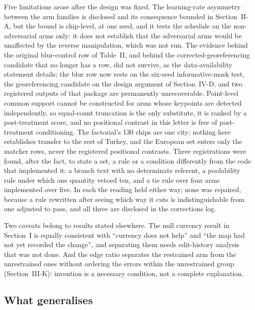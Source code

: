 Five limitations arose after the design was fixed. The learning-rate asymmetry between the
arm families is disclosed and its consequence bounded in Section~II-A, but the bound is
chip-level, at one seed, and it tests the schedule on the non-adversarial arms only: it
does not establish that the adversarial arms would be unaffected by the reverse
manipulation, which was not run. The evidence behind the original blur-control row of Table~II, and behind the
corrected-georeferencing candidate that no longer has a row, did not survive, as the
data-availability statement details; the blur row now rests on the six-seed
informative-mask test, the georeferencing candidate on the design argument of
Section~IV-D, and two registered outputs of that package are permanently
unrecoverable. Point-level common support cannot be
constructed for arms whose keypoints are detected independently, so equal-count truncation
is the only substitute, it is ranked by a post-treatment score, and no positional contrast
in this letter is free of post-treatment conditioning. The factorial's 130 chips are one
city; nothing here establishes transfer to the rest of Turkey, and the European set enters
only the matcher rows, never the registered positional contrasts. Three registrations were
found, after the fact, to state a set, a rule or a condition differently from the code
that implemented it: a branch text with no determinate referent, a poolability rule under
which one quantity vetoed ten, and a tie rule over four arms implemented over five. In each
the reading held either way; none was repaired, because a rule rewritten after seeing
which way it cuts is indistinguishable from one adjusted to pass, and all three are
disclosed in the corrections log.

Two caveats belong to results stated elsewhere. The null currency result in
Section~I is equally consistent with ``currency does not help'' and ``the map had not yet
recorded the change'', and separating them needs edit-history analysis that was not done.
And the edge ratio separates the restrained arm from the unrestrained ones without
ordering the errors within the unrestrained group (Section~III-K): invention is a
necessary condition, not a complete explanation.

\subsection{What generalises}

